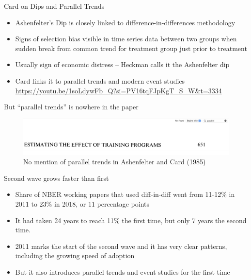 \documentclass{beamer}
\begin{document}
\begin{frame}{Card on Dips and Parallel Trends}

\begin{itemize}

\item Ashenfelter's Dip is closely linked to difference-in-differences methodology
\item Signs of selection bias visible in time series data between two groups when sudden break from common trend for treatment group just prior to treatment
\item Usually sign of economic distress -- Heckman calls it the Ashenfelter dip
\item Card links it to parallel trends and modern event studies \\ \url{https://youtu.be/1soLdywFb_Q?si=PV16tqFJpKgT_S_W&t=3334}
\end{itemize}

\end{frame}


\begin{frame}{But ``parallel trends'' is nowhere in the paper}

	\begin{figure}
	\caption{No mention of parallel trends in Ashenfelter and Card (1985)}
	\includegraphics[scale=0.2]{./lecture_includes/nomention.png}
	\end{figure}

\end{frame}




\begin{frame}{Second wave grows faster than first}

\begin{itemize}
\item Share of NBER working papers that used diff-in-diff went from 11-12\% in 2011 to 23\% in 2018, or 11 percentage points
\item It had taken 24 years to reach 11\% the first time, but only 7 years the second time. 
\item 2011 marks the start of the second wave and it has very clear patterns, including the growing speed of adoption
\item But it also introduces parallel trends and event studies for the first time
\end{itemize}

\end{frame}
\end{document}
